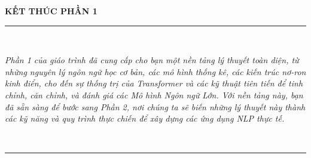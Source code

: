 \documentclass[11pt, a4paper, twoside]{book}
\begin{document}
% 
% 
% 
% 
% 
% 
% 

% 
% 
% 
% 
% 


\clearpage
\thispagestyle{empty}

\begin{center}
    \vspace*{4cm}
    {\Huge \textbf{KẾT THÚC PHẦN 1}} \\[1.5cm]

    \rule{0.8\textwidth}{0.4pt} \\[0.8cm]

    \parbox{0.9\textwidth}{
        \centering
        \textit{
        Phần 1 của giáo trình đã cung cấp cho bạn một nền tảng lý thuyết toàn diện, 
        từ những nguyên lý ngôn ngữ học cơ bản, các mô hình thống kê, 
        các kiến trúc nơ-ron kinh điển, cho đến sự thống trị của Transformer 
        và các kỹ thuật tiên tiến để tinh chỉnh, căn chỉnh, và đánh giá các 
        Mô hình Ngôn ngữ Lớn. Với nền tảng này, bạn đã sẵn sàng để bước sang 
        Phần 2, nơi chúng ta sẽ biến những lý thuyết này thành các kỹ năng và 
        quy trình thực chiến để xây dựng các ứng dụng NLP thực tế.
        }
    } \\[1cm]

    \rule{0.8\textwidth}{0.4pt} \\[2cm]
\end{center}
\end{document}
